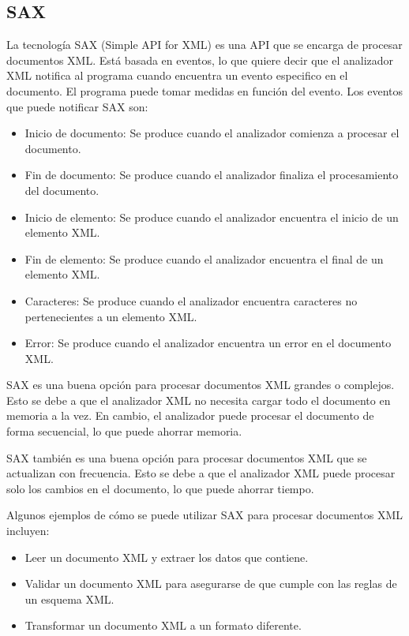 \subsection{SAX}
La tecnología SAX (Simple API for XML) es una API que se encarga de procesar documentos XML. Está basada en eventos, lo que quiere decir que el analizador XML notifica al programa cuando encuentra un evento especifico en el documento. El programa puede tomar medidas en función del evento. Los eventos que puede notificar SAX son:
\begin{itemize}
    \item Inicio de documento: Se produce cuando el analizador comienza a procesar el documento.
    \item Fin de documento: Se produce cuando el analizador finaliza el procesamiento del documento.
    \item Inicio de elemento: Se produce cuando el analizador encuentra el inicio de un elemento XML.
    \item Fin de elemento: Se produce cuando el analizador encuentra el final de un elemento XML.
    \item Caracteres: Se produce cuando el analizador encuentra caracteres no pertenecientes a un elemento XML.
    \item Error: Se produce cuando el analizador encuentra un error en el documento XML.
\end{itemize}

SAX es una buena opción para procesar documentos XML grandes o complejos. Esto se debe a que el analizador XML no necesita cargar todo el documento en memoria a la vez. En cambio, el analizador puede procesar el documento de forma secuencial, lo que puede ahorrar memoria.

SAX también es una buena opción para procesar documentos XML que se actualizan con frecuencia. Esto se debe a que el analizador XML puede procesar solo los cambios en el documento, lo que puede ahorrar tiempo.

Algunos ejemplos de cómo se puede utilizar SAX para procesar documentos XML incluyen:
\begin{itemize}
    \item Leer un documento XML y extraer los datos que contiene.
    \item Validar un documento XML para asegurarse de que cumple con las reglas de un esquema XML.
    \item Transformar un documento XML a un formato diferente.
\end{itemize}

